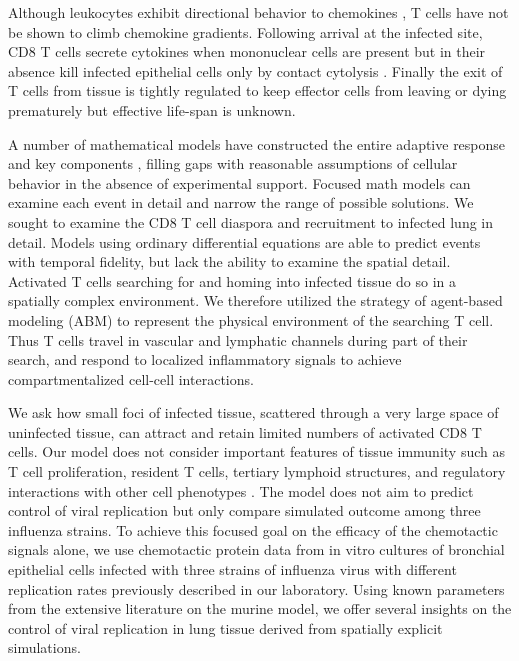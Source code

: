 \documentclass[10pt]{article}
\begin{document}
Although leukocytes exhibit directional behavior to chemokines \cite{LiJeon2002, McDonald2010}, T cells have not be shown to climb chemokine gradients.   Following arrival at the infected site, CD8 T cells secrete cytokines when mononuclear cells are present but in their absence kill infected epithelial cells only by contact cytolysis \cite{Hufford2011}.   Finally the exit of T cells from tissue is tightly regulated to keep effector cells from leaving or dying prematurely \cite{Jennrich2012, Richter2007} but effective life-span is unknown. 

A number of mathematical models have constructed the entire adaptive response and key components \cite{Miao2010, Saenz2010, Beltman2007, Handel2008, Zheng2008, Lee2009}, filling gaps with reasonable assumptions of cellular behavior in the absence of experimental support.  Focused math models can examine each event in detail and narrow the range of possible solutions.  We sought to examine the CD8 T cell diaspora and recruitment to infected lung in detail.  Models using ordinary differential equations are able to predict events with temporal fidelity, but lack the ability to examine the spatial detail.   Activated T cells searching for and homing into infected tissue do so in a spatially complex environment.  We therefore utilized the strategy of agent-based modeling (ABM) to represent the physical environment of the searching T cell.  Thus T cells travel in vascular and lymphatic channels during part of their search, and respond to localized inflammatory signals to achieve compartmentalized cell-cell interactions.  

We ask how small foci of infected tissue, scattered through a very large space of uninfected tissue, can attract and retain limited numbers of activated CD8 T cells.  Our model does not consider important features of tissue immunity such as T cell proliferation, resident T cells, tertiary lymphoid structures, and regulatory interactions with other cell phenotypes \cite{McGill2009}.  The model does not aim to predict control of viral replication but only compare simulated outcome among three influenza strains.  To achieve this focused goal on the efficacy of the chemotactic signals alone, we use chemotactic protein data from in vitro cultures of bronchial epithelial cells infected with three strains of influenza virus with different replication rates \cite{Mitchell2011} previously described in our laboratory.  Using known parameters from the extensive literature on the murine model, we offer several insights on the control of viral replication in lung tissue derived from spatially explicit simulations.  
\end{document}
